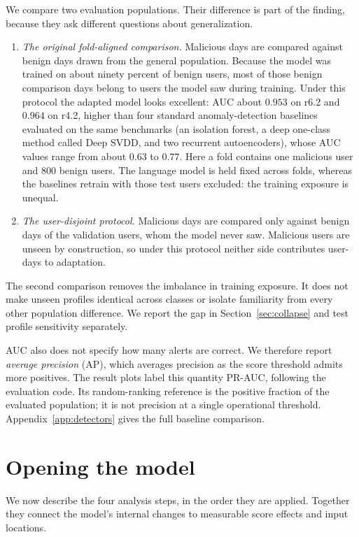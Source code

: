 \documentclass[10pt]{article} %
\begin{document}
We compare two evaluation populations. Their difference is part of
the finding, because they ask different questions about generalization.
\begin{enumerate}
\item \emph{The original fold-aligned comparison.} Malicious days are compared against
benign days drawn from the general population. Because the model was
trained on about ninety percent of benign users, most of those benign
comparison days belong to users the model saw during training. Under
this protocol the adapted model looks excellent: AUC about $0.953$ on
r6.2 and $0.964$ on r4.2, higher than four standard anomaly-detection
baselines evaluated on the same benchmarks (an isolation forest, a
deep one-class method called Deep SVDD, and two
recurrent autoencoders), whose AUC values range from about $0.63$ to
$0.77$. Here a fold contains one malicious user and $800$ benign users.
The language model is held fixed across folds, whereas the baselines
retrain with those test users excluded: the training exposure is unequal.
\item \emph{The user-disjoint protocol.} Malicious days are compared
only against benign days of the validation users, whom the model never
saw. Malicious users are unseen by construction, so under this protocol
neither side contributes user-days to adaptation.
\end{enumerate}
The second comparison removes the imbalance in training exposure.
It does not make unseen profiles identical across classes or isolate
familiarity from every other population difference. We report the gap in
Section~\ref{sec:collapse} and test profile sensitivity separately.

AUC also does not specify how many alerts are correct. We therefore report
\emph{average precision} (AP), which averages precision as the score
threshold admits more positives. The result plots label this quantity
PR-AUC, following the evaluation code. Its random-ranking reference is
the positive fraction of the evaluated population; it is not precision
at a single operational threshold. Appendix~\ref{app:detectors} gives the
full baseline comparison.

\section{Opening the model}
\label{sec:method}

We now describe the four analysis steps, in the order they are applied.
Together they connect the model's internal changes to measurable
score effects and input locations.
\end{document}
